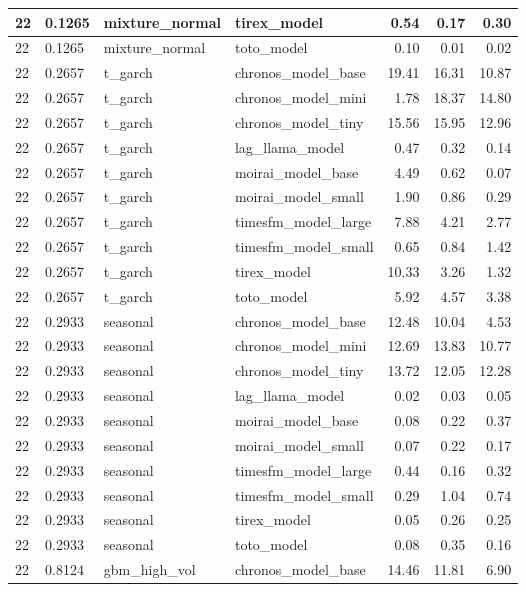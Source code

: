 {\begin{tabular}{llllrrr}
22 & 0.1265 & mixture\_normal & tirex\_model & 0.54 & 0.17 & 0.30 \\
\midrule
22 & 0.1265 & mixture\_normal & toto\_model & 0.10 & 0.01 & 0.02 \\
\midrule
22 & 0.2657 & t\_garch & chronos\_model\_base & 19.41 & 16.31 & 10.87 \\
\midrule
22 & 0.2657 & t\_garch & chronos\_model\_mini & 1.78 & 18.37 & 14.80 \\
\midrule
22 & 0.2657 & t\_garch & chronos\_model\_tiny & 15.56 & 15.95 & 12.96 \\
\midrule
22 & 0.2657 & t\_garch & lag\_llama\_model & 0.47 & 0.32 & 0.14 \\
\midrule
22 & 0.2657 & t\_garch & moirai\_model\_base & 4.49 & 0.62 & 0.07 \\
\midrule
22 & 0.2657 & t\_garch & moirai\_model\_small & 1.90 & 0.86 & 0.29 \\
\midrule
22 & 0.2657 & t\_garch & timesfm\_model\_large & 7.88 & 4.21 & 2.77 \\
\midrule
22 & 0.2657 & t\_garch & timesfm\_model\_small & 0.65 & 0.84 & 1.42 \\
\midrule
22 & 0.2657 & t\_garch & tirex\_model & 10.33 & 3.26 & 1.32 \\
\midrule
22 & 0.2657 & t\_garch & toto\_model & 5.92 & 4.57 & 3.38 \\
\midrule
22 & 0.2933 & seasonal & chronos\_model\_base & 12.48 & 10.04 & 4.53 \\
\midrule
22 & 0.2933 & seasonal & chronos\_model\_mini & 12.69 & 13.83 & 10.77 \\
\midrule
22 & 0.2933 & seasonal & chronos\_model\_tiny & 13.72 & 12.05 & 12.28 \\
\midrule
22 & 0.2933 & seasonal & lag\_llama\_model & 0.02 & 0.03 & 0.05 \\
\midrule
22 & 0.2933 & seasonal & moirai\_model\_base & 0.08 & 0.22 & 0.37 \\
\midrule
22 & 0.2933 & seasonal & moirai\_model\_small & 0.07 & 0.22 & 0.17 \\
\midrule
22 & 0.2933 & seasonal & timesfm\_model\_large & 0.44 & 0.16 & 0.32 \\
\midrule
22 & 0.2933 & seasonal & timesfm\_model\_small & 0.29 & 1.04 & 0.74 \\
\midrule
22 & 0.2933 & seasonal & tirex\_model & 0.05 & 0.26 & 0.25 \\
\midrule
22 & 0.2933 & seasonal & toto\_model & 0.08 & 0.35 & 0.16 \\
\midrule
22 & 0.8124 & gbm\_high\_vol & chronos\_model\_base & 14.46 & 11.81 & 6.90 \\

\end{tabular}}
